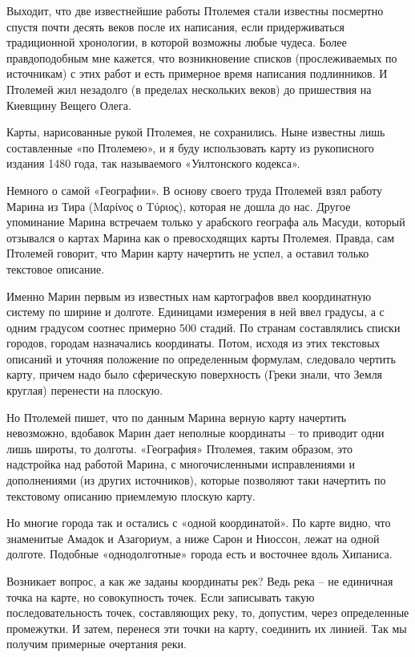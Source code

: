 Выходит, что две известнейшие работы Птолемея стали известны посмертно спустя почти десять веков после их написания, если придерживаться традиционной хронологии, в которой возможны любые чудеса. Более правдоподобным мне кажется, что возникновение списков (прослеживаемых по источникам) с этих работ и есть примерное время написания подлинников. И Птолемей жил незадолго (в пределах нескольких веков) до пришествия на Киевщину Вещего Олега.

Карты, нарисованные рукой Птолемея, не сохранились. Ныне известны лишь составленные «по Птолемею», и я буду использовать карту из рукописного издания 1480 года, так называемого «Уилтонского кодекса».

Немного о самой «Географии». В основу своего труда Птолемей взял работу Марина из Тира (Μαρίνος ο Τύριος), которая не дошла до нас. Другое упоминание Марина встречаем только у арабского географа аль Масуди, который отзывался о картах Марина как о превосходящих карты Птолемея. Правда, сам Птолемей говорит, что Марин карту начертить не успел, а оставил только текстовое описание.

Именно Марин первым из известных нам картографов ввел координатную систему по ширине и долготе. Единицами измерения в ней ввел градусы, а с одним градусом соотнес примерно 500 стадий. По странам составлялись списки городов, городам назначались координаты. Потом, исходя из этих текстовых описаний и уточняя положение по определенным формулам, следовало чертить карту, причем надо было сферическую поверхность (Греки знали, что Земля круглая) перенести на плоскую.

Но Птолемей пишет, что по данным Марина верную карту начертить невозможно, вдобавок Марин дает не\-полные координаты – то приводит одни лишь широты, то долготы. «География» Птолемея, таким образом, это надстройка над работой Марина, с многочисленными исправлениями и дополнениями (из других источников), которые позволяют таки начертить по текстовому описанию приемлемую плоскую карту. 

Но многие города так и остались с «одной координатой». По карте видно, что знаменитые Амадок и Азагориум, а ниже Сарон и Ниоссон, лежат на одной долготе. Подобные «однодолготные» города есть и восточнее вдоль Хипаниса.

Возникает вопрос, а как же заданы координаты рек? Ведь река – не единичная точка на карте, но совокупность точек. Если записывать такую последовательность точек, составляющих реку, то, допустим, через определенные промежутки. И затем, перенеся эти точки на карту, соединить их линией. Так мы получим примерные очертания реки.

